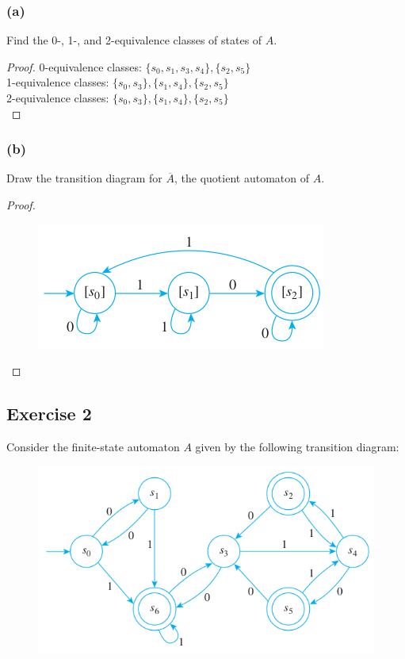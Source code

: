 \documentclass[14pt]{extarticle}
\begin{document}
\subsubsection{(a)}
Find the 0-, 1-, and 2-equivalence classes of states of \(A\).

\begin{proof}
    0-equivalence classes: \(\{s_0, s_1, s_3, s_4\}, \{s_2, s_5\}\) \\
    1-equivalence classes: \(\{s_0, s_3\}, \{s_1, s_4\}, \{s_2, s_5\}\) \\
    2-equivalence classes: \(\{s_0, s_3\}, \{s_1, s_4\}, \{s_2, s_5\}\) \\
\end{proof}

\subsubsection{(b)}
Draw the transition diagram for \(\overline{A}\), the quotient automaton of \(A\).

\begin{proof}
    \begin{figure}[ht!]
        \centering
        \includegraphics[scale=0.5]{../images/12.3.1.b.png}
    \end{figure}
\end{proof}

\subsection{Exercise 2}
Consider the finite-state automaton \(A\) given by the following transition diagram:

\begin{figure}[ht!]
    \centering
    \includegraphics[scale=0.5]{../images/12.3.2.png}
\end{figure}
\end{document}
